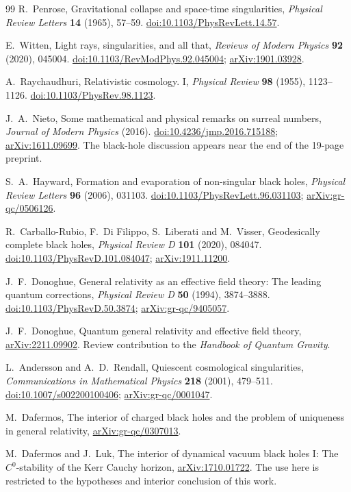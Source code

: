 \documentclass[11pt,a4paper]{article}
\numberwithin{equation}{section}
\theoremstyle{definition}
\theoremstyle{remark}
\newcommand{\arxiv}[1]{\href{https://arxiv.org/abs/#1}{arXiv:#1}}
\newcommand{\doi}[1]{\href{https://doi.org/#1}{doi:#1}}
\begin{document}
\begin{thebibliography}{99}
R.~Penrose, Gravitational collapse and space-time singularities,
\emph{Physical Review Letters} \textbf{14} (1965), 57--59.
\doi{10.1103/PhysRevLett.14.57}.

E.~Witten, Light rays, singularities, and all that,
\emph{Reviews of Modern Physics} \textbf{92} (2020), 045004.
\doi{10.1103/RevModPhys.92.045004}; \arxiv{1901.03928}.

A.~Raychaudhuri, Relativistic cosmology. I,
\emph{Physical Review} \textbf{98} (1955), 1123--1126.
\doi{10.1103/PhysRev.98.1123}.

J.~A.~Nieto, Some mathematical and physical remarks on surreal numbers,
\emph{Journal of Modern Physics} (2016).
\doi{10.4236/jmp.2016.715188}; \arxiv{1611.09699}.
The black-hole discussion appears near the end of the 19-page preprint.

S.~A.~Hayward, Formation and evaporation of non-singular black holes,
\emph{Physical Review Letters} \textbf{96} (2006), 031103.
\doi{10.1103/PhysRevLett.96.031103}; \arxiv{gr-qc/0506126}.

R.~Carballo-Rubio, F.~Di Filippo, S.~Liberati and M.~Visser,
Geodesically complete black holes,
\emph{Physical Review D} \textbf{101} (2020), 084047.
\doi{10.1103/PhysRevD.101.084047}; \arxiv{1911.11200}.

J.~F.~Donoghue, General relativity as an effective field theory: The leading
quantum corrections, \emph{Physical Review D} \textbf{50} (1994), 3874--3888.
\doi{10.1103/PhysRevD.50.3874}; \arxiv{gr-qc/9405057}.

J.~F.~Donoghue, Quantum general relativity and effective field theory,
\arxiv{2211.09902}. Review contribution to the \emph{Handbook of Quantum Gravity}.

L.~Andersson and A.~D.~Rendall, Quiescent cosmological singularities,
\emph{Communications in Mathematical Physics} \textbf{218} (2001), 479--511.
\doi{10.1007/s002200100406}; \arxiv{gr-qc/0001047}.

M.~Dafermos, The interior of charged black holes and the problem of uniqueness
in general relativity, \arxiv{gr-qc/0307013}.

M.~Dafermos and J.~Luk, The interior of dynamical vacuum black holes I:
The $C^0$-stability of the Kerr Cauchy horizon, \arxiv{1710.01722}.
The use here is restricted to the hypotheses and interior conclusion of this work.


\end{thebibliography}
\end{document}
